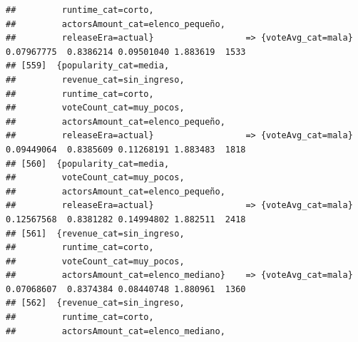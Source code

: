 \documentclass[
]{article}
\begin{document}
\begin{verbatim}
##         runtime_cat=corto,                                                                                                      
##         actorsAmount_cat=elenco_pequeño,                                                                                        
##         releaseEra=actual}                  => {voteAvg_cat=mala}                0.07967775  0.8386214 0.09501040 1.883619  1533
## [559]  {popularity_cat=media,                                                                                                   
##         revenue_cat=sin_ingreso,                                                                                                
##         runtime_cat=corto,                                                                                                      
##         voteCount_cat=muy_pocos,                                                                                                
##         actorsAmount_cat=elenco_pequeño,                                                                                        
##         releaseEra=actual}                  => {voteAvg_cat=mala}                0.09449064  0.8385609 0.11268191 1.883483  1818
## [560]  {popularity_cat=media,                                                                                                   
##         voteCount_cat=muy_pocos,                                                                                                
##         actorsAmount_cat=elenco_pequeño,                                                                                        
##         releaseEra=actual}                  => {voteAvg_cat=mala}                0.12567568  0.8381282 0.14994802 1.882511  2418
## [561]  {revenue_cat=sin_ingreso,                                                                                                
##         runtime_cat=corto,                                                                                                      
##         voteCount_cat=muy_pocos,                                                                                                
##         actorsAmount_cat=elenco_mediano}    => {voteAvg_cat=mala}                0.07068607  0.8374384 0.08440748 1.880961  1360
## [562]  {revenue_cat=sin_ingreso,                                                                                                
##         runtime_cat=corto,                                                                                                      
##         actorsAmount_cat=elenco_mediano,                                                                                        

\end{verbatim}
\end{document}
